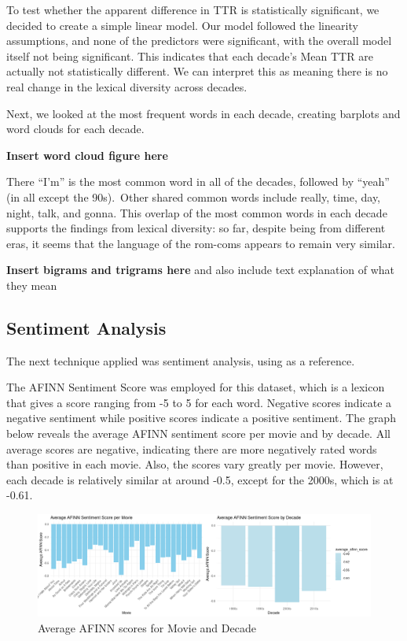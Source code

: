 \documentclass[
  authoryear,
  preprint]{elsarticle}
\begin{document}
To test whether the apparent difference in TTR is statistically
significant, we decided to create a simple linear model. Our model
followed the linearity assumptions, and none of the predictors were
significant, with the overall model itself not being significant. This
indicates that each decade's Mean TTR are actually not statistically
different. We can interpret this as meaning there is no real change in
the lexical diversity across decades.

Next, we looked at the most frequent words in each decade, creating
barplots and word clouds for each decade.

\textbf{Insert word cloud figure here}

There ``I'm'' is the most common word in all of the decades, followed by
``yeah'' (in all except the 90s).~Other shared common words include
really, time, day, night, talk, and gonna. This overlap of the most
common words in each decade supports the findings from lexical
diversity: so far, despite being from different eras, it seems that the
language of the rom-coms appears to remain very similar.

\textbf{Insert bigrams and trigrams here} and also include text
explanation of what they mean

\subsection{Sentiment Analysis}\label{sentiment-analysis}

The next technique applied was sentiment analysis, using
\citet{pang2008opinion} as a reference.

The AFINN Sentiment Score was employed for this dataset, which is a
lexicon that gives a score ranging from -5 to 5 for each word. Negative
scores indicate a negative sentiment while positive scores indicate a
positive sentiment. The graph below reveals the average AFINN sentiment
score per movie and by decade. All average scores are negative,
indicating there are more negatively rated words than positive in each
movie. Also, the scores vary greatly per movie. However, each decade is
relatively similar at around -0.5, except for the 2000s, which is at
-0.61.~

\begin{figure}[H]

{\centering \includegraphics{images/avg_afinn-imageonline.co-merged.png}

}

\caption{Average AFINN scores for Movie and Decade}

\end{figure}%
\end{document}
